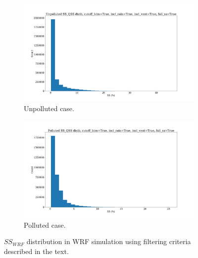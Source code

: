 \documentclass{article}
\begin{document}
\begin{figure}[ht]
	\centering
	\begin{subfigure}{0.7\textwidth}
		\includegraphics[width=\textwidth]{revmywrf/v12_ss_qss_hist_Unpolluted_figure.png}
		\caption{Unpolluted case.}
		\label{wrfssqsshistunpoll}
	\end{subfigure}
	\begin{subfigure}{0.7\textwidth}
		\includegraphics[width=\textwidth]{revmywrf/v12_ss_qss_hist_Polluted_figure.png}
		\caption{Polluted case.}
		\label{wrfssqsshistpoll}
	\end{subfigure}
	\caption{$SS_{WRF}$ distribution in WRF simulation using filtering criteria described in the text.}
	\label{wrfssqsshist}
\end{figure}
\end{document}
